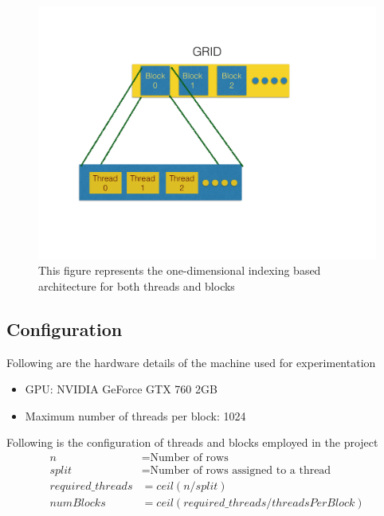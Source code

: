 \documentclass{article}
\begin{document}
\begin{figure}[ht]
        \includegraphics[width=\textwidth]{GPU.pdf}
        \caption{This figure represents the one-dimensional indexing based architecture for both threads and blocks}
        \centering
\end{figure}

\subsection*{Configuration}
Following are the hardware details of the machine used for experimentation
\begin{itemize}
    \item GPU: NVIDIA GeForce GTX 760 2GB
    \item Maximum number of threads per block: 1024
\end{itemize}

Following is the configuration of threads and blocks employed in the project
\begin{align*}
        n &= \text{Number of rows}\\
        split &= \text{Number of rows assigned to a thread}\\
        required\_threads &= ceil(n/split)\\
        numBlocks &= ceil(required\_threads/threadsPerBlock)
\end{align*}
\end{document}
